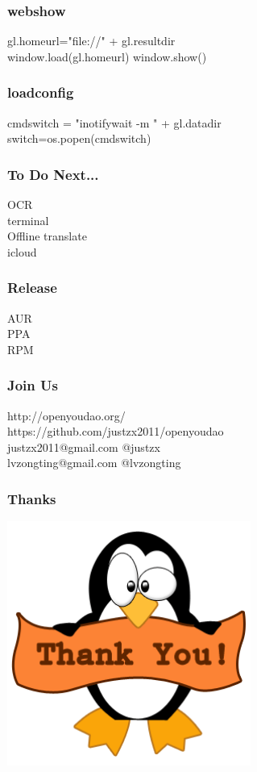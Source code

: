 \documentclass[10pt]{beamer}
\begin{document}
\begin{frame}
  \frametitle{webshow}

gl.homeurl="file://" + gl.resultdir\\
window.load(gl.homeurl)
window.show()  
\end{frame}

\begin{frame}
  \frametitle{loadconfig}

cmdswitch = "inotifywait  -m " + gl.datadir\\
switch=os.popen(cmdswitch)\\
\end{frame}

\begin{frame}
  \frametitle{To Do Next...}

OCR\\
terminal\\
Offline translate\\
icloud
\end{frame}

\begin{frame}
  \frametitle{Release}

AUR\\
PPA\\
RPM
\end{frame}

\begin{frame}
  \frametitle{Join Us}

http://openyoudao.org/\\
https://github.com/justzx2011/openyoudao\\
justzx2011@gmail.com  @justzx\\
lvzongting@gmail.com  @lvzongting\\

\end{frame}

\begin{frame}
  \frametitle{Thanks}
\begin{center} 
  \includegraphics[width=0.6\textwidth]{thanks.png}
\end{center}
\end{frame}

\end{document}
